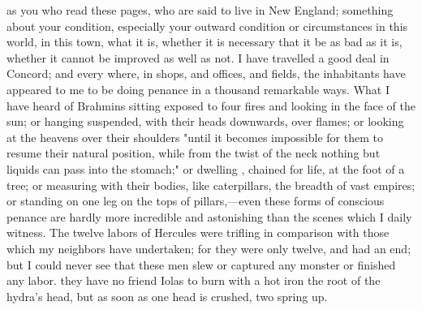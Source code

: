 as you who read these pages, who are said to live in New England; something
about your condition, especially your outward condition or circumstances in
this world, in this town, what it is, whether it is necessary that it be as
bad as it is, whether it cannot be improved as well as not. I have travelled a
good deal in Concord; and every where, in shops, and offices, and fields, the
inhabitants have appeared to me to be doing penance in a thousand remarkable
ways. What I have heard of Brahmins sitting exposed to four fires and looking
in the face of the sun; or hanging suspended, with their heads downwards, over
flames; or looking at the heavens over their shoulders "until it becomes
impossible for them to resume their natural position, while from the twist of
the neck nothing but liquids can pass into the stomach;" or dwelling , chained
for life, at the foot of a tree; or measuring with their bodies, like
caterpillars, the breadth of vast empires; or standing on one leg on the tops
of pillars,---even these forms of conscious penance are hardly more incredible
and astonishing than the scenes which I daily witness. The twelve labors of
Hercules were trifling in comparison with those which my neighbors have
undertaken; for they were only twelve, and had an end; but I could never see
that these men slew or captured any monster or finished any labor. they have
no friend Iolas to burn with a hot iron the root of the hydra's head, but as
soon as one head is crushed, two spring up.
